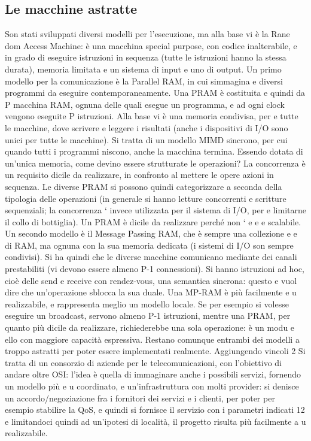 \subsection{Le macchine astratte}
Son stati sviluppati diversi modelli per l'esecuzione, ma alla base vi è la Rane
dom Access Machine: è una macchina special purpose, con codice inalterabile,
e
in grado di eseguire istruzioni in sequenza (tutte le istruzioni hanno la stessa
durata), memoria limitata e un sistema di input e uno di output.
Un primo modello per la comunicazione è la Parallel RAM, in cui simmagina
e
diversi programmi da eseguire contemporaneamente. Una PRAM è costituita
e
quindi da P macchina RAM, ognuna delle quali esegue un programma, e ad ogni
clock vengono eseguite P istruzioni. Alla base vi è una memoria condivisa, per
e
tutte le macchine, dove scrivere e leggere i risultati (anche i dispositivi di I/O
sono unici per tutte le macchine). Si tratta di un modello MIMD sincrono, per
cui quando tutti i programmi niscono, anche la macchina termina. Essendo
dotata di un'unica memoria, come devino essere strutturate le operazioni? La
concorrenza è un requisito dicile da realizzare, in confronto al mettere le opere
azioni in sequenza. Le diverse PRAM si possono quindi categorizzare a seconda
della tipologia delle operazioni (in generale si hanno letture concorrenti e scritture sequenziali; la concorrenza `
invece utilizzata per il sistema di I/O, per
e
limitarne il collo di bottiglia). Un PRAM è dicile da realizzare perché non `
e
e
e
scalabile.
Un secondo modello è il Message Passing RAM, che è sempre una collezione
e
e
di RAM, ma ognuna con la sua memoria dedicata (i sistemi di I/O son sempre
condivisi). Si ha quindi che le diverse macchine comunicano mediante dei canali
prestabiliti (vi devono essere almeno P-1 connessioni). Si hanno istruzioni ad
hoc, cioè delle send e receive con rendez-vous, una semantica sincrona: questo
e
vuol dire che un'operazione sblocca la sua duale. Una MP-RAM è più facilmente
e u
realizzabile, e rappresenta meglio un modello locale. Se per esempio si volesse
eseguire un broadcast, servono almeno P-1 istruzioni, mentre una PRAM, per
quanto più dicile da realizzare, richiederebbe una sola operazione: è un modu
e
ello con maggiore capacità espressiva. Restano comunque entrambi dei modelli
a
troppo astratti per poter essere implementati realmente. Aggiungendo vincoli
2 Si tratta di un consorzio di aziende per le telecomunicazioni, con l'obiettivo di andare
oltre OSI: l'idea è quella di immaginare anche i possibili servizi, fornendo un modello più
e
u
coordinato, e un'infrastruttura con molti provider: si denisce un accordo/negoziazione fra i
fornitori dei servizi e i clienti, per poter per esempio stabilire la QoS, e quindi si fornisce il
servizio con i parametri indicati
12
e limitandoci quindi ad un'ipotesi di località, il progetto risulta più facilmente
a
u
realizzabile.
